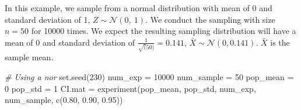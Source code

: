 \documentclass[
]{article}
\newenvironment{Shaded}{\begin{snugshade}}{\end{snugshade}}
\newcommand{\AttributeTok}[1]{\textcolor[rgb]{0.77,0.63,0.00}{#1}}
\newcommand{\CommentTok}[1]{\textcolor[rgb]{0.56,0.35,0.01}{\textit{#1}}}
\newcommand{\DecValTok}[1]{\textcolor[rgb]{0.00,0.00,0.81}{#1}}
\newcommand{\FloatTok}[1]{\textcolor[rgb]{0.00,0.00,0.81}{#1}}
\newcommand{\FunctionTok}[1]{\textcolor[rgb]{0.00,0.00,0.00}{#1}}
\newcommand{\NormalTok}[1]{#1}
\newcommand{\OtherTok}[1]{\textcolor[rgb]{0.56,0.35,0.01}{#1}}
\newcommand{\SpecialCharTok}[1]{\textcolor[rgb]{0.00,0.00,0.00}{#1}}
\newcommand{\StringTok}[1]{\textcolor[rgb]{0.31,0.60,0.02}{#1}}
\begin{document}
\begin{Shaded}
\end{Shaded}

In this example, we sample from a normal distribution with mean of 0 and
standard deviation of 1, \(Z \sim \mathcal{N}\left(0, \ 1\right)\). We
conduct the sampling with size \(n=50\) for 10000 times. We expect the
resulting sampling distribution will have a mean of 0 and standard
deviation of \(\frac{1}{\sqrt(50)} = 0.141\),
\(\bar{X} \sim \mathcal{N}\left(0, 0.141\right).\) \(\bar{X}\) is the
sample mean.

\begin{Shaded}
\begin{Highlighting}[]
\CommentTok{\# Using a nor}
\FunctionTok{set.seed}\NormalTok{(}\DecValTok{230}\NormalTok{)}
\NormalTok{num\_exp }\OtherTok{=} \DecValTok{10000}
\NormalTok{num\_sample }\OtherTok{=} \DecValTok{50}
\NormalTok{pop\_mean }\OtherTok{=} \DecValTok{0}
\NormalTok{pop\_std }\OtherTok{=} \DecValTok{1}
\NormalTok{CI.mat }\OtherTok{=} \FunctionTok{experiment}\NormalTok{(pop\_mean, pop\_std, num\_exp, num\_sample, }\FunctionTok{c}\NormalTok{(}\FloatTok{0.80}\NormalTok{, }\FloatTok{0.90}\NormalTok{, }\FloatTok{0.95}\NormalTok{))}
\end{Highlighting}
\end{Shaded}
\end{document}
